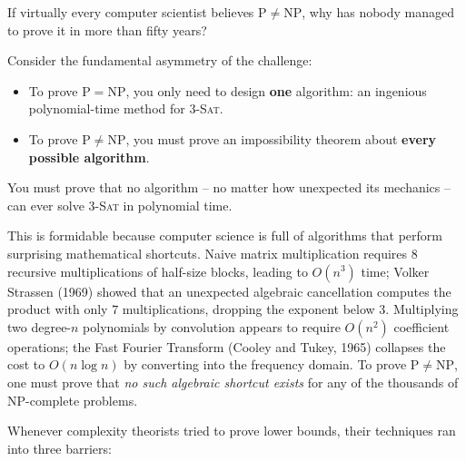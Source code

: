 If virtually every computer scientist believes $\mathrm{P} \neq \mathrm{NP}$, why has nobody managed to prove it in more than fifty years?

Consider the fundamental asymmetry of the challenge:
\begin{itemize}
  \item To prove $\mathrm{P} = \mathrm{NP}$, you only need to design \textbf{one} algorithm: an ingenious polynomial-time method for \textsc{3-Sat}.
  \item To prove $\mathrm{P} \neq \mathrm{NP}$, you must prove an impossibility theorem about \textbf{every possible algorithm}.
\end{itemize}
You must prove that no algorithm -- no matter how unexpected its mechanics -- can ever solve \textsc{3-Sat} in polynomial time.

This is formidable because computer science is full of algorithms that perform surprising mathematical shortcuts. Naive matrix multiplication requires $8$ recursive multiplications of half-size blocks, leading to $O(n^3)$ time; Volker Strassen (1969) showed that an unexpected algebraic cancellation computes the product with only $7$ multiplications, dropping the exponent below $3$. Multiplying two degree-$n$ polynomials by convolution appears to require $O(n^2)$ coefficient operations; the Fast Fourier Transform (Cooley and Tukey, 1965) collapses the cost to $O(n \log n)$ by converting into the frequency domain. To prove $\mathrm{P} \neq \mathrm{NP}$, one must prove that \emph{no such algebraic shortcut exists} for any of the thousands of $\mathrm{NP}$-complete problems.

Whenever complexity theorists tried to prove lower bounds, their techniques ran into three barriers:

